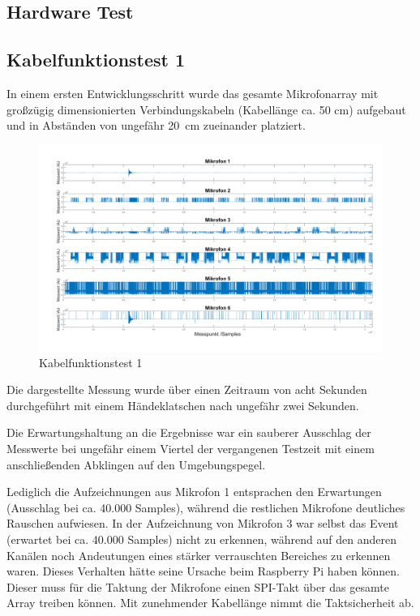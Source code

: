 \subsection{Hardware Test}

\subsection{Kabelfunktionstest 1}

In einem ersten Entwicklungsschritt wurde das gesamte Mikrofonarray mit großzügig dimensionierten Verbindungskabeln (Kabellänge ca. 50 cm) aufgebaut und in Abständen von ungefähr \SI{20}{cm} zueinander platziert. 

\begin{figure}[h]
	\begin{center}
		\includegraphics[scale=0.1]{Sections/Tests/Test_1_d}
	\end{center}
	\caption{Kabelfunktionstest 1}
	\label{fig:Test_1_d}
\end{figure}

Die dargestellte Messung wurde über einen Zeitraum von acht Sekunden durchgeführt mit einem Händeklatschen nach ungefähr zwei Sekunden.

Die Erwartungshaltung an die Ergebnisse war ein sauberer Ausschlag der Messwerte bei ungefähr einem Viertel der vergangenen Testzeit mit einem anschließenden Abklingen auf den Umgebungspegel.

Lediglich die Aufzeichnungen aus Mikrofon 1 entsprachen den Erwartungen (Ausschlag bei ca. 40.000 Samples), während die restlichen Mikrofone deutliches Rauschen aufwiesen. In der Aufzeichnung von Mikrofon 3 war selbst das Event (erwartet bei ca. 40.000 Samples) nicht zu erkennen, während auf den anderen Kanälen noch Andeutungen eines stärker verrauschten Bereiches zu erkennen waren. Dieses Verhalten hätte seine Ursache beim Raspberry Pi haben können. Dieser muss für die Taktung der Mikrofone einen SPI-Takt über das gesamte Array treiben können. Mit zunehmender Kabellänge nimmt die Taktsicherheit ab. 

